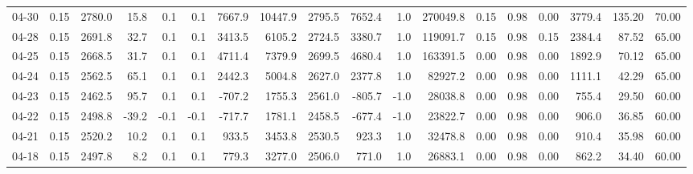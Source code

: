 \begin{threeparttable}
{\begin{tabular}{lrrrrrrrrrrrrrrrrr}
  04-30 &     0.15 & 2780.0 &              15.8 &               0.1 &                0.1 &             7667.9 & 10447.9 & 2795.5 &     7652.4 &                      1.0 &            270049.8 &       0.15 &      0.98 &           0.00 &           3779.4 &          135.20 &                  70.00 \\
  04-28 &     0.15 & 2691.8 &              32.7 &               0.1 &                0.1 &             3413.5 &  6105.2 & 2724.5 &     3380.7 &                      1.0 &            119091.7 &       0.15 &      0.98 &           0.15 &           2384.4 &           87.52 &                  65.00 \\
  04-25 &     0.15 & 2668.5 &              31.7 &               0.1 &                0.1 &             4711.4 &  7379.9 & 2699.5 &     4680.4 &                      1.0 &            163391.5 &       0.00 &      0.98 &           0.00 &           1892.9 &           70.12 &                  65.00 \\
  04-24 &     0.15 & 2562.5 &              65.1 &               0.1 &                0.1 &             2442.3 &  5004.8 & 2627.0 &     2377.8 &                      1.0 &             82927.2 &       0.00 &      0.98 &           0.00 &           1111.1 &           42.29 &                  65.00 \\
  04-23 &     0.15 & 2462.5 &              95.7 &               0.1 &                0.1 &             -707.2 &  1755.3 & 2561.0 &     -805.7 &                     -1.0 &             28038.8 &       0.00 &      0.98 &           0.00 &            755.4 &           29.50 &                  60.00 \\
  04-22 &     0.15 & 2498.8 &             -39.2 &              -0.1 &               -0.1 &             -717.7 &  1781.1 & 2458.5 &     -677.4 &                     -1.0 &             23822.7 &       0.00 &      0.98 &           0.00 &            906.0 &           36.85 &                  60.00 \\
  04-21 &     0.15 & 2520.2 &              10.2 &               0.1 &                0.1 &              933.5 &  3453.8 & 2530.5 &      923.3 &                      1.0 &             32478.8 &       0.00 &      0.98 &           0.00 &            910.4 &           35.98 &                  60.00 \\
  04-18 &     0.15 & 2497.8 &               8.2 &               0.1 &                0.1 &              779.3 &  3277.0 & 2506.0 &      771.0 &                      1.0 &             26883.1 &       0.00 &      0.98 &           0.00 &            862.2 &           34.40 &                  60.00 \\

\end{tabular}}
\end{threeparttable}
